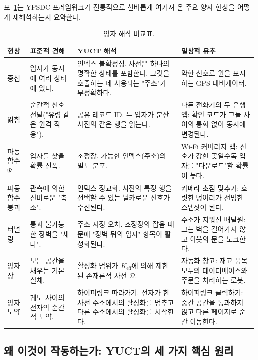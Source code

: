 \documentclass[12pt,a4paper]{article}
\begin{document}
	표~\ref{tab:quantum-interpretations}는 YPSDC 프레임워크가 전통적으로 신비롭게 여겨져 온 주요 양자 현상을 어떻게 재해석하는지 요약한다.
	
	\begin{table}[H]
		\centering
		\caption{양자 해석 비교표.}
		\label{tab:quantum-interpretations}
		\small
		\begin{tabularx}{\textwidth}{p{2.5cm} p{2.8cm} p{4.2cm} p{4.5cm}}
			\toprule
			\textbf{현상} & \textbf{표준적 견해} & \textbf{YUCT 해석} & \textbf{일상적 유추} \\
			\midrule
			중첩 &
			입자가 동시에 여러 상태에 있다. &
			인덱스 불확정성. 사전은 하나의 명확한 상태를 포함한다. 그것을 호출하는 데 사용되는 "주소"가 부정확하다. &
			약한 신호로 원을 표시하는 GPS 내비게이터. \\
			\addlinespace
			얽힘 &
			순간적 신호 전달("유령 같은 원격 작용"). &
			공유 레코드 ID. 두 입자가 분산 사전의 같은 행을 읽는다. &
			다른 전화기의 두 은행 앱: 확인 코드가 그들 사이의 통화 없이 동시에 변경된다. \\
			\addlinespace
			파동 함수 $ \Psi $ &
			입자를 찾을 확률 진폭. &
			조정장. 가능한 인덱스(주소)의 밀도 분포. &
			Wi-Fi 커버리지 맵: 신호가 강한 곳일수록 입자를 "다운로드"할 확률이 높다. \\
			\addlinespace
			파동 함수 붕괴 &
			관측에 의한 신비로운 "축소". &
			인덱스 정교화. 사전의 특정 행을 선택할 수 있는 날카로운 신호가 수신된다. &
			카메라 초점 맞추기: 흐릿한 덩어리가 선명한 스냅샷이 된다. \\
			\addlinespace
			터널링 &
			통과 불가능한 장벽을 "새다". &
			주소 지정 오차. 조정장의 잡음 때문에 "장벽 뒤의 입자" 항목이 활성화된다. &
			주소가 지워진 배달원: 그는 벽을 걸어가지 않고 이웃의 문을 노크한다. \\
			\addlinespace
			양자장 &
			모든 공간을 채우는 기본 실체. &
			활성화 범위가 $K_{\mathrm{eff}}$에 의해 제한된 존재론적 사전 $\mathcal{D}$. &
			자동화 창고: 재고 품목 모두의 데이터베이스와 주문을 처리하는 로봇. \\
			\addlinespace
			양자 도약 &
			궤도 사이의 전자의 순간적 도약. &
			하이퍼링크 따라가기. 전자가 한 사전 주소에서의 활성화를 멈추고 다른 주소에서의 활성화를 시작한다. &
			하이퍼링크 클릭하기: 중간 공간을 통과하지 않고 다른 페이지로 순간 이동한다. \\
			\bottomrule
		\end{tabularx}
	\end{table}
	
	\subsection{왜 이것이 작동하는가: YUCT의 세 가지 핵심 원리}
	
\end{document}
